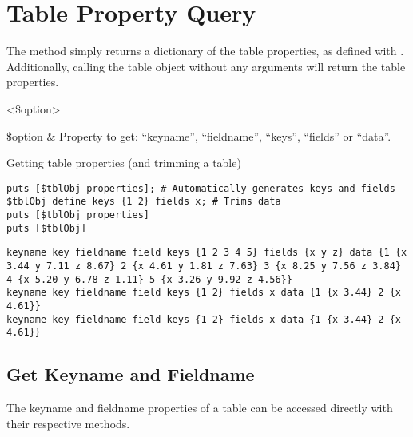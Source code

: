 \section{Table Property Query}
The method  simply returns a dictionary of the table properties, as defined with .
Additionally, calling the table object without any arguments will return the table properties.
\begin{syntax}
 <\$option>
\end{syntax}
\begin{args}
\$option & Property to get: ``keyname'', ``fieldname'', ``keys'', ``fields'' or ``data''. 
\end{args}
\begin{example}{Getting table properties (and trimming a table)}
\begin{lstlisting}
puts [$tblObj properties]; # Automatically generates keys and fields
$tblObj define keys {1 2} fields x; # Trims data
puts [$tblObj properties]
puts [$tblObj]
\end{lstlisting}
\tcblower
\begin{lstlisting}
keyname key fieldname field keys {1 2 3 4 5} fields {x y z} data {1 {x 3.44 y 7.11 z 8.67} 2 {x 4.61 y 1.81 z 7.63} 3 {x 8.25 y 7.56 z 3.84} 4 {x 5.20 y 6.78 z 1.11} 5 {x 3.26 y 9.92 z 4.56}}
keyname key fieldname field keys {1 2} fields x data {1 {x 3.44} 2 {x 4.61}}
keyname key fieldname field keys {1 2} fields x data {1 {x 3.44} 2 {x 4.61}}
\end{lstlisting}
\end{example}

\subsection{Get Keyname and Fieldname}
The keyname and fieldname properties of a table can be accessed directly with their respective methods. 
\begin{syntax}
\end{syntax}
\begin{syntax}
\end{syntax}

\clearpage
